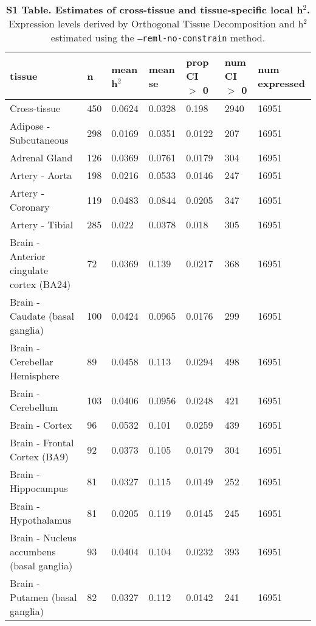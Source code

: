 \documentclass[10pt,letterpaper]{article}
\date{}
\begin{document}
\vspace*{0.35in}


\begin{table}[!ht]
\begin{adjustwidth}{-2.25in}{0in} %
\caption*{{\bf S1 Table. Estimates of cross-tissue and tissue-specific local h$^2$.} Expression levels derived by Orthogonal Tissue Decomposition and h$^2$ estimated using the \texttt{--reml-no-constrain} method.}
\centering
\begin{tabular}{lllllll}
  \hline
tissue & n & mean h$^2$ & mean se & prop CI $>$ 0 & num CI $>$ 0 & num expressed \\ 
  \hline
Cross-tissue & 450 & 0.0624 & 0.0328 & 0.198 & 2940 & 16951 \\ 
  Adipose - Subcutaneous & 298 & 0.0169 & 0.0351 & 0.0122 & 207 & 16951 \\ 
  Adrenal Gland & 126 & 0.0369 & 0.0761 & 0.0179 & 304 & 16951 \\ 
  Artery - Aorta & 198 & 0.0216 & 0.0533 & 0.0146 & 247 & 16951 \\ 
  Artery - Coronary & 119 & 0.0483 & 0.0844 & 0.0205 & 347 & 16951 \\ 
  Artery - Tibial & 285 & 0.022 & 0.0378 & 0.018 & 305 & 16951 \\ 
  Brain - Anterior cingulate cortex (BA24) & 72 & 0.0369 & 0.139 & 0.0217 & 368 & 16951 \\ 
  Brain - Caudate (basal ganglia) & 100 & 0.0424 & 0.0965 & 0.0176 & 299 & 16951 \\ 
  Brain - Cerebellar Hemisphere & 89 & 0.0458 & 0.113 & 0.0294 & 498 & 16951 \\ 
  Brain - Cerebellum & 103 & 0.0406 & 0.0956 & 0.0248 & 421 & 16951 \\ 
  Brain - Cortex & 96 & 0.0532 & 0.101 & 0.0259 & 439 & 16951 \\ 
  Brain - Frontal Cortex (BA9) & 92 & 0.0373 & 0.105 & 0.0179 & 304 & 16951 \\ 
  Brain - Hippocampus & 81 & 0.0327 & 0.115 & 0.0149 & 252 & 16951 \\ 
  Brain - Hypothalamus & 81 & 0.0205 & 0.119 & 0.0145 & 245 & 16951 \\ 
  Brain - Nucleus accumbens (basal ganglia) & 93 & 0.0404 & 0.104 & 0.0232 & 393 & 16951 \\ 
  Brain - Putamen (basal ganglia) & 82 & 0.0327 & 0.112 & 0.0142 & 241 & 16951 \\ 

\end{tabular}
\end{adjustwidth}
\end{table}
\end{document}
